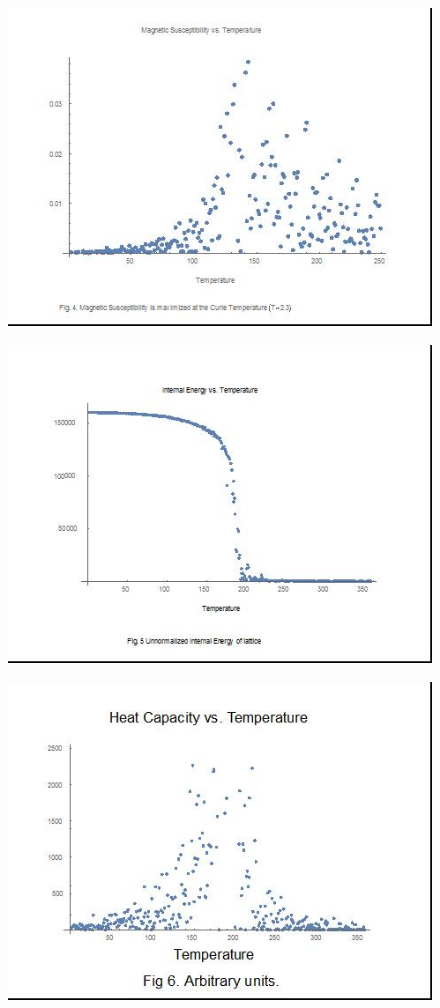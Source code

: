\documentclass[a4paper]{article}
\begin{document}
\begin{figure}
\centering
\includegraphics[width = 15cm]{fig3.jpg}
\end{figure}


\begin{figure}
\centering
\includegraphics[width = 15cm]{fig5.jpg}
\end{figure}


\begin{figure}
\centering
\includegraphics[width = 15cm]{fig6.jpg}
\end{figure}
\end{document}
